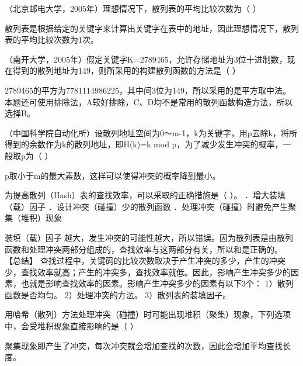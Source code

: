 \question （北京邮电大学，2005年）理想情况下，散列表的平均比较次数为（ ）
\par{}
\begin{solution}散列表是根据给定的关键字来计算出关键字在表中的地址，因此理想情况下，散列表的平均比较次数为1次。
\end{solution}
\question （南开大学，2005年）假定关键字K=2789465，允许存储地址为3位十进制数，现在得到的散列地址为149，则所采用的构建散列函数的方法是（
）
\par{}
\begin{solution}2789465的平方为7781114986225，其中间3位为149，所以采用的是平方取中法。
本题还可使用排除法，A较好排除，C、D均不是常用的散列函数构造方法，所以选择B。
\end{solution}
\question （中国科学院自动化所）设散列地址空间为0～m-1，k为关键字，用p去除k，将所得到的余数作为k的散列地址，即H(k)=k
mod p，为了减少发生冲突的概率，一般取p为（ ）
\par{}
\begin{solution}p取小于m的最大素数，这样可以使得冲突的概率降到最小。
\end{solution}
\question 为提高散列（Hash）表的查找效率，可以采取的正确措施是（ ）。
．增大装填（载）因子 ．设计冲突（碰撞）少的散列函数
．处理冲突（碰撞）时避免产生聚集（堆积）现象
\par{}
\begin{solution}装填（载）因子越大，发生冲突的可能性越大，所以错误。因为散列表是由散列函数和处理冲突两部分组成的，查找效率与这两部分有关，所以和是正确的。
【总结】
查找过程中，关键码的比较次数取决于产生冲突的多少，产生的冲突少，查找效率就高；产生的冲突多，查找效率就低。因此，影响产生冲突多少的因素，也就是影响查找效率的因素。影响产生冲突多少的因素有以下3个：
1）散列函数是否均匀。 2）处理冲突的方法。 3）散列表的装填因子。
\end{solution}
\question 用哈希（散列）方法处理冲突（碰撞）时可能出现堆积（聚集）现象，下列选项中，会受堆积现象直接影响的是（
）
\par{}
\begin{solution}聚集现象即产生了冲突，每次冲突就会增加查找的次数，因此会增加平均查找长度。
\end{solution}
